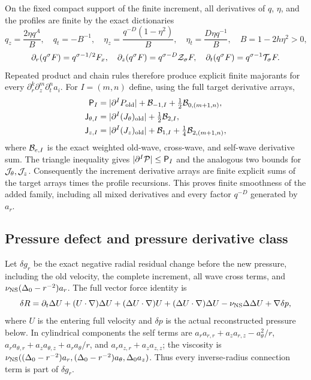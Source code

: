 \documentclass[11pt]{article}
\begin{document}
On the fixed compact support of the finite increment, all derivatives of
$q$, $\eta$, and the profiles are finite by the exact dictionaries
\[
 q_z=\frac{2\eta q^A}{B},\quad q_t=-B^{-1},\quad
 \eta_z=\frac{q^{-D}(1-\eta^2)}B,\quad
 \eta_t=\frac{D\eta q^{-1}}B,
 \quad B=1-2h\eta^2>0,
\]
\[
 \partial_r(q^\sigma F)=q^{\sigma-1/2}F_x,\quad
 \partial_z(q^\sigma F)=q^{\sigma-D}{\cal Z}_\sigma F,\quad
 \partial_t(q^\sigma F)=q^{\sigma-1}{\cal T}_\sigma F.
\]
Repeated product and chain rules therefore produce explicit finite
majorants for every $\partial_r^k\partial_z^m\partial_t^n a_i$.
For $I=(m,n)$ define, using the full target derivative arrays,
\begin{equation}\label{mccp:target_majorants}
\begin{aligned}
 \mathsf P_I&=|\partial^IP_{\rm old}|+{\cal B}_{-1,I}
                         +\tfrac12{\cal B}_{0,(m+1,n)},\\
 \mathsf J_{\theta,I}&=|\partial^I(J_\theta)_{\rm old}|
                         +\tfrac12{\cal B}_{2,I},\\
 \mathsf J_{z,I}&=|\partial^I(J_z)_{\rm old}|+{\cal B}_{1,I}
                         +\tfrac14{\cal B}_{2,(m+1,n)},
\end{aligned}
\end{equation}
where ${\cal B}_{e,I}$ is the exact weighted old-wave, cross-wave, and
self-wave derivative sum. The triangle inequality gives
$|\partial^I{\cal P}|\le\mathsf P_I$ and the analogous two bounds for
${\cal J}_\theta,{\cal J}_z$. Consequently the increment derivative
arrays are finite explicit sums of the target arrays times the profile
recursions. This proves finite smoothness of the added family, including
all mixed derivatives and every factor $q^{-D}$ generated by $a_r$.

\subsection{Pressure defect and pressure derivative class}

Let $\delta g_r$ be the exact negative radial residual change before the
new pressure, including the old velocity, the complete increment, all
wave cross terms, and $\nu_{\rm NS}(\Delta_0-r^{-2})a_r$. The full vector
force identity is
\begin{equation}\label{mccp:full_force_identity}
 \delta R=\partial_t\Delta U+(U\cdot\nabla)\Delta U
 +(\Delta U\cdot\nabla)U+(\Delta U\cdot\nabla)\Delta U
 -\nu_{\rm NS}\Delta\Delta U+\nabla\delta p,
\end{equation}
where $U$ is the entering full velocity and $\delta p$ is the actual
reconstructed pressure below. In cylindrical components the self terms
are $a_ra_{r,r}+a_za_{r,z}-a_\theta^2/r$,
$a_ra_{\theta,r}+a_za_{\theta,z}+a_ra_\theta/r$, and
$a_ra_{z,r}+a_za_{z,z}$; the viscosity is
$\nu_{\rm NS}((\Delta_0-r^{-2})a_r,
(\Delta_0-r^{-2})a_\theta,\Delta_0a_z)$.
Thus every inverse-radius connection term is part of $\delta g_r$.
\end{document}
